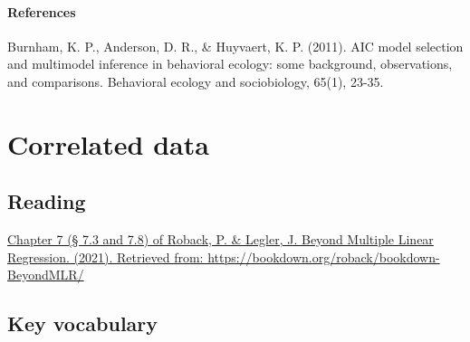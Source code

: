 \documentclass[
  openany]{book}
\begin{document}
\hypertarget{references}{%
\paragraph{References}\label{references}}

Burnham, K. P., Anderson, D. R., \& Huyvaert, K. P. (2011). AIC model selection and multimodel inference in behavioral ecology: some background, observations, and comparisons. Behavioral ecology and sociobiology, 65(1), 23-35.

\hypertarget{correlated-data}{%
\section{Correlated data}\label{correlated-data}}

\hypertarget{reading}{%
\subsection{Reading}\label{reading}}

\href{https://bookdown.org/roback/bookdown-BeyondMLR/ch-corrdata.html\#recognizing-correlation}{Chapter 7 (§ 7.3 and 7.8) of Roback, P. \& Legler, J. Beyond Multiple Linear Regression. (2021). Retrieved from: https://bookdown.org/roback/bookdown-BeyondMLR/}

\hypertarget{key-vocabulary}{%
\subsection{Key vocabulary}\label{key-vocabulary}}
\end{document}
